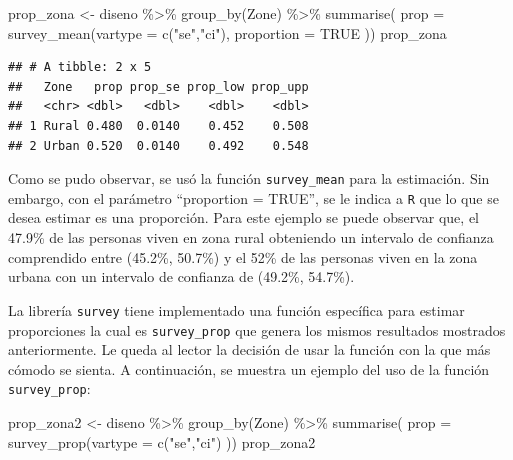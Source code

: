 \documentclass[
  12pt,
]{book}
\newenvironment{Shaded}{\begin{snugshade}}{\end{snugshade}}
\newcommand{\AttributeTok}[1]{\textcolor[rgb]{0.77,0.63,0.00}{#1}}
\newcommand{\ConstantTok}[1]{\textcolor[rgb]{0.00,0.00,0.00}{#1}}
\newcommand{\FunctionTok}[1]{\textcolor[rgb]{0.00,0.00,0.00}{#1}}
\newcommand{\NormalTok}[1]{#1}
\newcommand{\OtherTok}[1]{\textcolor[rgb]{0.56,0.35,0.01}{#1}}
\newcommand{\SpecialCharTok}[1]{\textcolor[rgb]{0.00,0.00,0.00}{#1}}
\newcommand{\StringTok}[1]{\textcolor[rgb]{0.31,0.60,0.02}{#1}}
\begin{document}
\begin{Shaded}
\begin{Highlighting}[]
\NormalTok{prop\_zona }\OtherTok{\textless{}{-}}\NormalTok{ diseno }\SpecialCharTok{\%\textgreater{}\%} \FunctionTok{group\_by}\NormalTok{(Zone) }\SpecialCharTok{\%\textgreater{}\%} 
             \FunctionTok{summarise}\NormalTok{(}
             \AttributeTok{prop =} \FunctionTok{survey\_mean}\NormalTok{(}\AttributeTok{vartype =} \FunctionTok{c}\NormalTok{(}\StringTok{"se"}\NormalTok{,}\StringTok{"ci"}\NormalTok{), }
                    \AttributeTok{proportion =} \ConstantTok{TRUE}\NormalTok{ ))}
\NormalTok{prop\_zona}
\end{Highlighting}
\end{Shaded}

\begin{verbatim}
## # A tibble: 2 x 5
##   Zone   prop prop_se prop_low prop_upp
##   <chr> <dbl>   <dbl>    <dbl>    <dbl>
## 1 Rural 0.480  0.0140    0.452    0.508
## 2 Urban 0.520  0.0140    0.492    0.548
\end{verbatim}

Como se pudo observar, se usó la función \texttt{survey\_mean} para la estimación. Sin embargo, con el parámetro ``proportion = TRUE'', se le indica a \texttt{R} que lo que se desea estimar es una proporción. Para este ejemplo se puede observar que, el 47.9\% de las personas viven en zona rural obteniendo un intervalo de confianza comprendido entre (45.2\%, 50.7\%) y el 52\% de las personas viven en la zona urbana con un intervalo de confianza de (49.2\%, 54.7\%).

La librería \texttt{survey} tiene implementado una función específica para estimar proporciones la cual es \texttt{survey\_prop} que genera los mismos resultados mostrados anteriormente. Le queda al lector la decisión de usar la función con la que más cómodo se sienta. A continuación, se muestra un ejemplo del uso de la función \texttt{survey\_prop}:

\begin{Shaded}
\begin{Highlighting}[]
\NormalTok{prop\_zona2 }\OtherTok{\textless{}{-}}\NormalTok{ diseno }\SpecialCharTok{\%\textgreater{}\%} \FunctionTok{group\_by}\NormalTok{(Zone) }\SpecialCharTok{\%\textgreater{}\%} 
              \FunctionTok{summarise}\NormalTok{( }\AttributeTok{prop =} \FunctionTok{survey\_prop}\NormalTok{(}\AttributeTok{vartype =} \FunctionTok{c}\NormalTok{(}\StringTok{"se"}\NormalTok{,}\StringTok{"ci"}\NormalTok{) ))}
\NormalTok{prop\_zona2}
\end{Highlighting}
\end{Shaded}
\end{document}
